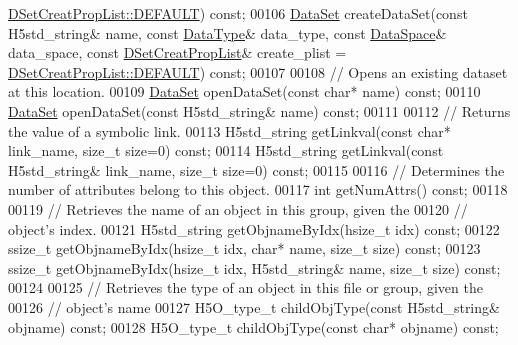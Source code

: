 \begin{DoxyCode}
      \hyperlink{class_h5_1_1_d_set_creat_prop_list_aea0be1dc39378736daeac7af787bbc8e}{DSetCreatPropList::DEFAULT}) \textcolor{keyword}{const};
00106         \hyperlink{class_h5_1_1_data_set}{DataSet} createDataSet(\textcolor{keyword}{const} H5std\_string& name, \textcolor{keyword}{const} \hyperlink{class_h5_1_1_data_type}{DataType}& data\_type, \textcolor{keyword}{const} 
      \hyperlink{class_h5_1_1_data_space}{DataSpace}& data\_space, \textcolor{keyword}{const} \hyperlink{class_h5_1_1_d_set_creat_prop_list}{DSetCreatPropList}& create\_plist = 
      \hyperlink{class_h5_1_1_d_set_creat_prop_list_aea0be1dc39378736daeac7af787bbc8e}{DSetCreatPropList::DEFAULT}) \textcolor{keyword}{const};
00107 
00108         \textcolor{comment}{// Opens an existing dataset at this location.}
00109         \hyperlink{class_h5_1_1_data_set}{DataSet} openDataSet(\textcolor{keyword}{const} \textcolor{keywordtype}{char}* name) \textcolor{keyword}{const};
00110         \hyperlink{class_h5_1_1_data_set}{DataSet} openDataSet(\textcolor{keyword}{const} H5std\_string& name) \textcolor{keyword}{const};
00111 
00112         \textcolor{comment}{// Returns the value of a symbolic link.}
00113         H5std\_string getLinkval(\textcolor{keyword}{const} \textcolor{keywordtype}{char}* link\_name, \textcolor{keywordtype}{size\_t} size=0) \textcolor{keyword}{const};
00114         H5std\_string getLinkval(\textcolor{keyword}{const} H5std\_string& link\_name, \textcolor{keywordtype}{size\_t} size=0) \textcolor{keyword}{const};
00115 
00116         \textcolor{comment}{// Determines the number of attributes belong to this object.}
00117         \textcolor{keywordtype}{int} getNumAttrs() \textcolor{keyword}{const};
00118 
00119         \textcolor{comment}{// Retrieves the name of an object in this group, given the}
00120         \textcolor{comment}{// object's index.}
00121         H5std\_string getObjnameByIdx(hsize\_t idx) \textcolor{keyword}{const};
00122         ssize\_t getObjnameByIdx(hsize\_t idx, \textcolor{keywordtype}{char}* name, \textcolor{keywordtype}{size\_t} size) \textcolor{keyword}{const};
00123         ssize\_t getObjnameByIdx(hsize\_t idx, H5std\_string& name, \textcolor{keywordtype}{size\_t} size) \textcolor{keyword}{const};
00124 
00125         \textcolor{comment}{// Retrieves the type of an object in this file or group, given the}
00126         \textcolor{comment}{// object's name}
00127         H5O\_type\_t childObjType(\textcolor{keyword}{const} H5std\_string& objname) \textcolor{keyword}{const};
00128         H5O\_type\_t childObjType(\textcolor{keyword}{const} \textcolor{keywordtype}{char}* objname) \textcolor{keyword}{const};

\end{DoxyCode}
